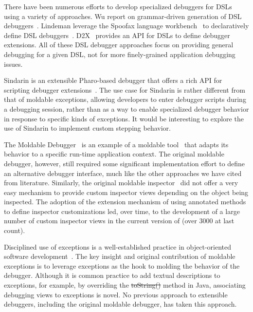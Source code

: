 \documentclass[sigplan,anonymous,review,10pt]{acmart}
\newcommand{\GT}{\lst{GT}\xspace} %
\begin{document}
There have been numerous efforts to develop specialized debuggers for DSLs using a variety of approaches.
Wu \etal report on grammar-driven generation of DSL debuggers~\cite{HuiW08a}.
Lindeman \etal leverage the Spoofax language workbench~\cite{Kats10a} to declaratively define DSL debuggers~\cite{Lind11a}.
D2X~\cite{Brah23a} provides an API for DSLs to define debugger extensions.
All of these DSL debugger approaches focus on providing general debugging for a given DSL, not for more finely-grained application debugging issues.

Sindarin is an extensible Pharo-based debugger that offers a rich API for scripting debugger extensions~\cite{Dupr19a}.
The use case for Sindarin is rather different from that of moldable exceptions, allowing developers to enter debugger scripts during a debugging session, rather than as a way to enable specialized debugger behavior in response to specific kinds of exceptions.
It would be interesting to explore the use of Sindarin to implement custom stepping behavior.

The Moldable Debugger~\cite{Chis15c} is an example of a moldable tool~\cite{Chis17a} that adapts its behavior to a specific run-time application context.
The original moldable debugger, however, still required some significant implementation effort to define an alternative debugger interface, much like the other approaches we have cited from literature.
Similarly, the original moldable inspector~\cite{Chis15a} did not offer a very easy mechanism to provide custom inspector views depending on the object being inspected.
The adoption of the extension mechanism of using annotated methods to define inspector customizations led, over time, to the development of a large number of custom inspector views in the current version of \GT (over 3000 at last count).

Disciplined use of exceptions is a well-established practice in object-oriented software development~\cite{Meye88a}.
The key insight and original contribution of moldable exceptions is to leverage exceptions as the hook to molding the behavior of the debugger.
Although it is common practice to add textual descriptions to exceptions, for example, by overriding the \st{toString()} method in Java, associating debugging views to exceptions is novel.
No previous approach to extensible debuggers, including the original moldable debugger, has taken this approach.
\end{document}
